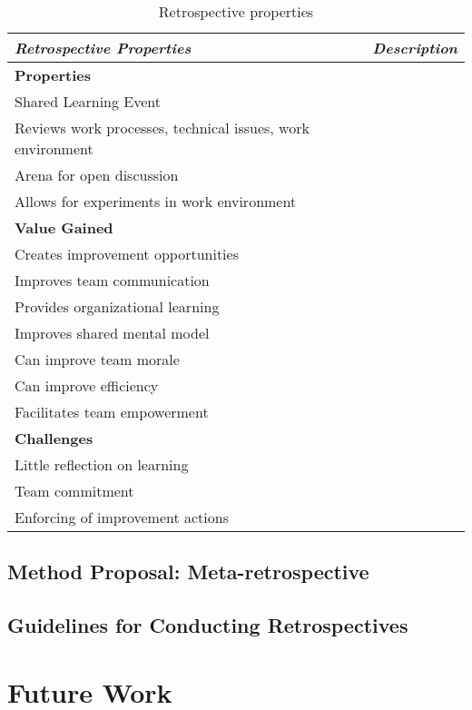 \begin{table}[h]
	\begin{center}
		\caption{Retrospective properties}
		\label{table:retrospective-properties}
		\begin{tabular}{p{} p{}}
			\hline
			\textit{Retrospective Properties} & \textit{Description} \\
			\hline
			\textbf{Properties} & \\
			Shared Learning Event & \\
			Reviews work processes, technical issues, work environment & \\
			Arena for open discussion & \\
			Allows for experiments in work environment & \\
			\hline
			\textbf{Value Gained} & \\
			Creates improvement opportunities & \\
			Improves team communication  & \\
			Provides organizational learning & \\
			Improves shared mental model & \\
			Can improve team morale & \\ 
			Can improve efficiency & \\
			Facilitates team empowerment & \\
			\hline 
			\textbf{Challenges} & \\
			Little reflection on learning & \\
			Team commitment & \\
			Enforcing of improvement actions & \\
			\hline
		\end{tabular}
	\end{center}
\end{table}


\subsection{Method Proposal: Meta-retrospective}

\subsection{Guidelines for Conducting Retrospectives}

\clearpage
\section{Future Work}
